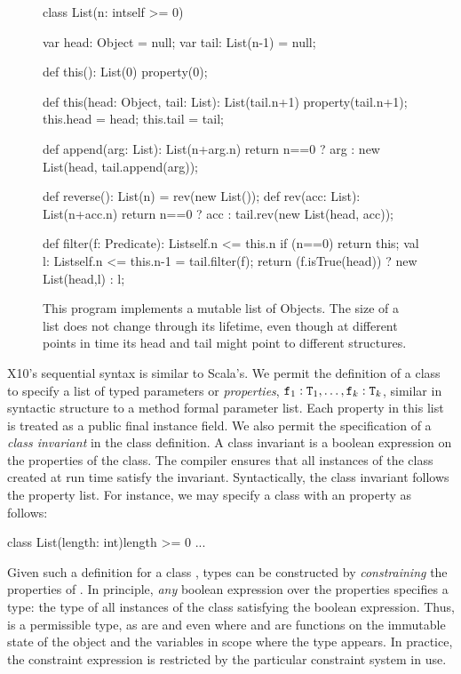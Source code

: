 \begin{figure}[t]
{
\footnotesize
\begin{xtenlines}
class List(n: int{self >= 0}) {
  var head: Object = null;
  var tail: List(n-1) = null;

  def this(): List(0) { property(0); }

  def this(head: Object, tail: List): List(tail.n+1) {
    property(tail.n+1);
    this.head = head;
    this.tail = tail;
  }

  def append(arg: List): List(n+arg.n) {
    return n==0
      ? arg : new List(head, tail.append(arg));
  }

  def reverse(): List(n) = rev(new List());
  def rev(acc: List): List(n+acc.n) {
    return n==0
      ? acc : tail.rev(new List(head, acc));
  }

  def filter(f: Predicate): List{self.n <= this.n} {
    if (n==0) return this;
    val l: List{self.n <= this.n-1} = tail.filter(f);
    return (f.isTrue(head)) ? new List(head,l) : l;
  }
}
\end{xtenlines}
}
\caption{
This program implements a mutable list of Objects. The size of a list
does not change through its lifetime, even though at different points
in time its head and tail might point to different structures.}
\label{fig:list-example}
\end{figure}

X10's sequential syntax is similar to Scala's.
We permit the definition of a class  to specify
a list of typed parameters or {\em properties},
${\tt f}_1: {\tt T}_1, \dots, {\tt f}_k: {\tt T}_k$,
similar in syntactic structure to a method formal parameter list.
%
Each property in this list is treated as a public final instance field.
%
We also permit the
specification of a {\em class invariant}
in the class definition. A class invariant
is a boolean expression on the properties of the class.
The compiler ensures that all
instances of the class created at run time satisfy the invariant.
%
Syntactically, the class invariant follows the property list.
%
For instance, we may specify a class  with an
  property as follows:
\begin{xtennoindent}
  class List(length: int){length >= 0} {...}
\end{xtennoindent}
Given such a definition for a class , types can be
constructed by {\em constraining} the properties of .  In
principle, {\em any} boolean expression over the properties
specifies a type: the type of all instances of the class
satisfying the boolean expression. Thus, 
is a permissible type, as are  and
even  where  and 
are functions on the immutable state of the  object
and the variables in scope where the type appears.
In practice, the constraint expression is restricted by the
particular constraint system in use.

